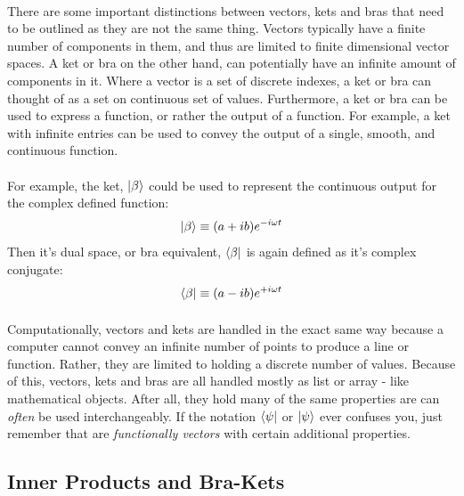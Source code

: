 \documentclass[12pt,letterpaper]{book}
\begin{document}
\paragraph*{}There are some important distinctions between vectors, kets and bras that need to be outlined as they are not the same thing. Vectors typically have a finite number of components in them, and thus are limited to finite dimensional vector spaces. A ket or bra on the other hand, can potentially have an infinite amount of components in it. Where a vector is a set of discrete indexes, a ket or bra can thought of as a set on continuous set of values. Furthermore, a ket or bra can be used to express a function, or rather the output of a function. For example, a ket with infinite entries can be used to convey the output of a single, smooth, and continuous function.
\paragraph*{}For example, the ket, $\ket{\beta}$ could be used to represent the continuous output for the complex defined function:
\begin{equation}
\label{smooth ket}
\ket{\beta} \equiv (a + ib) e^{-i\omega t}
\end{equation}
Then it's dual space, or bra equivalent, $\bra{\beta}$ is again defined as it's  complex conjugate: 
\begin{equation}
\label{smooth bra}
\bra{\beta} \equiv (a - ib) e^{+i\omega t}
\end{equation}

\paragraph*{}Computationally, vectors and kets are handled in the exact same way because a computer cannot convey an infinite number of points to produce a line or function. Rather, they are limited to holding a discrete number of values. Because of this, vectors, kets and bras are all handled mostly as list or array - like mathematical objects. After all, they hold many of the same properties are can \textit{often} be used interchangeably. If the notation $\bra{\psi}$ or $\ket{\psi}$ ever confuses you, just remember that are \textit{functionally vectors} with certain additional properties.


\subsection*{Inner Products and Bra-Kets}
\end{document}

